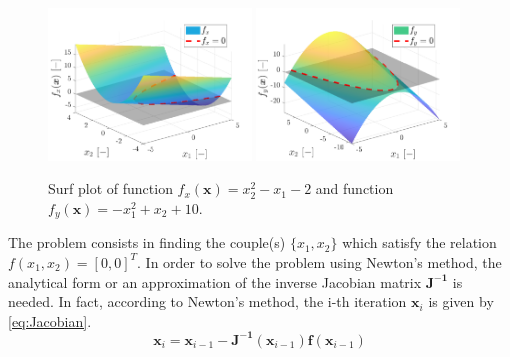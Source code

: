 \documentclass[11pt,a4paper,oneside]{article}
\renewcommand{\vec}[1]{\mathbf{#1}}
\begin{document}
\begin{figure}[h]
    \centering
    \includegraphics[width = 0.48\textwidth]{gfx/ex1_1.pdf}
    \includegraphics[width = 0.48\textwidth]{gfx/ex1_2.pdf}
    \caption{Surf plot of function $f_x(\vec{x})=x_2^2-x_1-2$ and function $f_y(\vec{x})=-x_1^2+x_2+10$.}\label{fig:ex1_1}
\end{figure}
The problem consists in finding the couple(s) $\{x_1, x_2\}$ which satisfy the relation $f(x_1,x_2)=[0, 0]^T$. In order to solve the problem using Newton's method, the analytical form or an approximation of the inverse Jacobian matrix $\vec{J^{-1}}$ is needed. In fact, according to Newton's method, the i-th iteration $\vec{x}_{i}$ is given by \autoref{eq:Jacobian}.
\begin{equation}
    \vec{x}_{i} = \vec{x}_{i-1} - \vec{J^{-1}}(\vec{x}_{i-1}) \vec{f}(\vec{x}_{i-1})
    \label{eq:Jacobian}
\end{equation}
\end{document}
